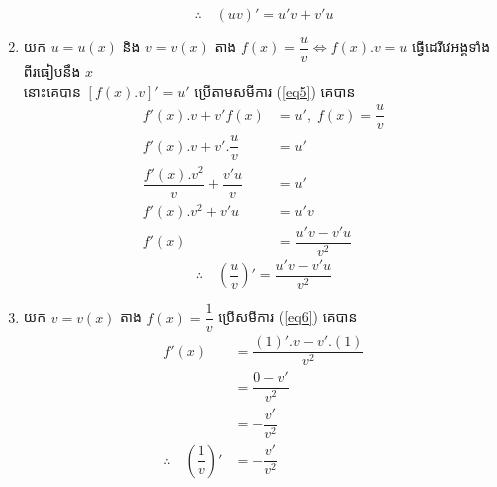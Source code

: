 \documentclass[a4paper,12pt]{article}
\begin{document}
\begin{enumerate}
	      \begin{equation}\label{eq5}
		      \therefore\quad (uv)'=u'v+v'u
	      \end{equation}
	\item យក $u=u(x)$ និង $v=v(x)$ តាង $f(x)=\dfrac{u}{v}\Leftrightarrow f(x).v=u$ ធ្វើដេរីវេអង្គទាំងពីរធៀបនឹង $x$ \\
	      នោះគេបាន $[f(x).v]'=u'$ ប្រើតាមសមីការ (\ref{eq5}) គេបាន
	      \begin{align*}
		      f'(x).v+v'f(x)                      & =u' ,\; f(x)=\dfrac{u}{v} \\
		      f'(x).v+v'. \dfrac{u}{v}            & =u'                       \\
		      \dfrac{f'(x).v^2}{v}+\dfrac{v'u}{v} & =u'                       \\
		      f'(x).v^2+v'u                       & =u'v                      \\
		      f'(x)                               & =\dfrac{u'v-v'u}{v^2}
	      \end{align*}
	      \begin{equation}\label{eq6}
		      \therefore\quad\left(\dfrac{u}{v}\right)'=\dfrac{u'v-v'u}{v^2}
	      \end{equation}
	\item យក $v=v(x)$ តាង $f(x)=\dfrac{1}{v}$ ប្រើសមីការ (\ref{eq6}) គេបាន
	      \begin{align*}
		      f'(x)                                       & =\dfrac{(1)'.v-v'.(1)}{v^2} \\
		                                                  & =\dfrac{0-v'}{v^2}          \\
		                                                  & =-\dfrac{v'}{v^2}           \\
		      \therefore \quad\left( \dfrac{1}{v}\right)' & =-\dfrac{v'}{v^2}
	      \end{align*}

\end{enumerate}
\end{document}
